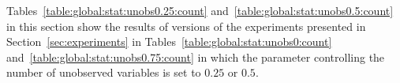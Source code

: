 
Tables~\ref{table:global:stat:unobs0.25:count} and~\ref{table:global:stat:unobs0.5:count} 
in this section show the results of versions of the experiments presented in Section~\ref{sec:experiments} in Tables~\ref{table:global:stat:unobs0:count} and~\ref{table:global:stat:unobs0.75:count} in which the parameter controlling 
the number of unobserved variables is set to $0.25$ or $0.5$.




 


